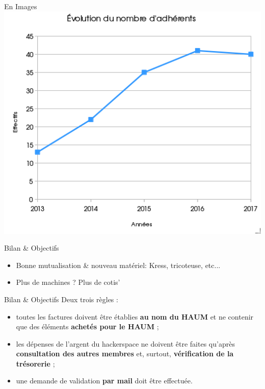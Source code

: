 \documentclass[10pt]{beamer}
\begin{document}
\begin{frame}{En Images}
	\center
	\includegraphics[width=\linewidth]{../convocation/4DossierAGAdherents2017.png}
\end{frame}

\begin{frame}{Bilan \& Objectifs}
	\begin{itemize}
		\item Bonne mutualisation \& nouveau matériel: Kress, tricoteuse, etc...
		\item Plus de machines ? Plus de cotis'
	\end{itemize}
\end{frame}

\begin{frame}{Bilan \& Objectifs}
	Deux trois règles :

	\begin{itemize}
	 \item toutes les factures doivent être établies \textbf{au nom du HAUM} et ne
	 contenir que des éléments \textbf{achetés pour le HAUM} ;
	 \item les dépenses de l'argent du hackerspace ne doivent être faites qu'après
	 \textbf{consultation des autres membres} et, surtout, \textbf{vérification de la
	 trésorerie} ;
	 \item une demande de validation \textbf{par mail} doit être effectuée.
	\end{itemize}
\end{frame}
\end{document}
